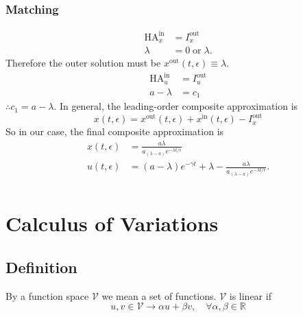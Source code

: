 \documentclass[12pt,twoside]{article}
\begin{document}
\subsubsection{Matching}
\begin{equation*}
  \begin{aligned}
    \text{HA}^{\text{in}}_x &= I^{\text{out}}_x \\
    \lambda &= 0 \;\text{or}\; \boxed{\lambda}.
  \end{aligned}
\end{equation*}
Therefore the outer solution must be $x^{\text{out}}(t,\epsilon)\equiv \lambda$.
\begin{equation*}
  \begin{aligned}
    \text{HA}^{\text{in}}_u &= I^{\text{out}}_u \\
    a-\lambda &= c_1
  \end{aligned}
\end{equation*}
$\therefore c_1=a-\lambda$. In general, the leading-order composite approximation
is
\begin{equation*}
  x(t,\epsilon) = x^{\text{out}}(t,\epsilon) + x^{\text{in}}(t,\epsilon) - I^{\text{out}}_x
\end{equation*}
So in our case, the final composite approximation is
\begin{equation*} \boxed{
    \begin{aligned}
      x(t,\epsilon) &= \frac{a\lambda}{a_(\lambda-a)e^{-\lambda t/\epsilon}} \\
      u(t,\epsilon) &= (a-\lambda)e^{-\gamma t} + \lambda -
      \frac{a\lambda}{a_(\lambda-a)e^{-\lambda t/\epsilon}}. \\
    \end{aligned}
  }
\end{equation*}

\section{Calculus of Variations}
\subsection{Definition}
By a function space $\mathcal{V}$ we mean a set of functions. $\mathcal{V}$ is
linear if
\begin{equation*}
  u,v\in\mathcal{V} \longrightarrow \alpha u+\beta v,\quad \forall \alpha,\beta\in\mathbb{R}
\end{equation*}
\end{document}
